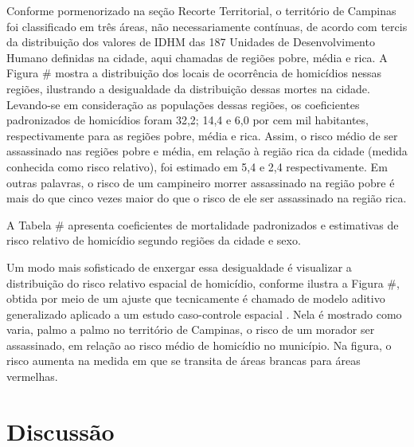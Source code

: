Conforme pormenorizado na seção Recorte Territorial, o território de Campinas foi classificado em três áreas, não necessariamente contínuas, de acordo com tercis da distribuição dos valores de IDHM das 187 Unidades de Desenvolvimento Humano definidas na cidade, aqui chamadas de regiões pobre, média e rica. A Figura \# mostra a distribuição dos locais de ocorrência de homicídios nessas regiões, ilustrando a desigualdade da distribuição dessas mortes na cidade. Levando-se em consideração as populações dessas regiões, os coeficientes padronizados de homicídios foram 32,2; 14,4 e 6,0 por cem mil habitantes, respectivamente para as regiões pobre, média e rica. Assim, o risco médio de ser assassinado nas regiões pobre e média, em relação à região rica da cidade (medida conhecida como risco relativo), foi estimado em 5,4 e 2,4 respectivamente. Em outras palavras, o risco de um campineiro morrer assassinado na região pobre é mais do que cinco vezes maior do que o risco de ele ser assassinado na região rica.

A Tabela \# apresenta coeficientes de mortalidade padronizados e estimativas de risco relativo de homicídio segundo regiões da cidade e sexo.

Um modo mais sofisticado de enxergar essa desigualdade é visualizar a distribuição do risco relativo espacial de homicídio, conforme ilustra a Figura \#, obtida por meio de um ajuste que tecnicamente é chamado de modelo aditivo generalizado aplicado a um estudo caso-controle espacial \citep{kelsall1995non}\citep{kelsall1998spatial}. Nela é mostrado como varia, palmo a palmo no território de Campinas, o risco de um morador ser assassinado, em relação ao risco médio de homicídio no município. Na figura, o risco aumenta na medida em que se transita de áreas brancas para áreas vermelhas.

\section{Discussão}